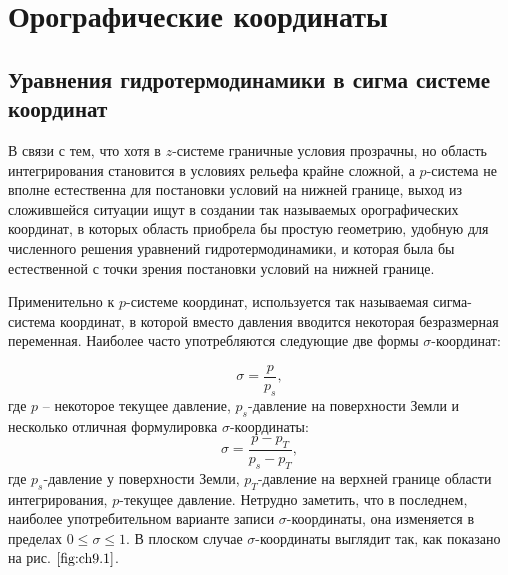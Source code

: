 \chapter{{\color{done}Орографические координаты}}



\section{{\color{done}Уравнения гидротермодинамики в сигма системе координат}}

В связи с тем, что хотя в $z$-системе граничные условия прозрачны, но область интегрирования становится в условиях рельефа крайне сложной, а $p$-система не вполне естественна для постановки условий на нижней границе, выход из сложившейся ситуации ищут в создании так называемых орографических координат, в которых область приобрела бы простую геометрию, удобную для численного решения уравнений гидротермодинамики, и которая была бы естественной с точки зрения постановки условий на нижней границе.

Применительно к $p$-системе координат, используется так называемая сигма-система координат, в которой вместо давления вводится некоторая безразмерная переменная. Наиболее часто употребляются следующие две формы $\sigma$-координат: 

\begin{equation}
\label{eq:sigma}
    \sigma=\frac{p}{p_s},
\end{equation}
где $p$ -- некоторое текущее давление, $p_s$-давление на поверхности Земли и несколько отличная формулировка $\sigma$-координаты:
\begin{equation}
    \sigma=\frac{p-p_T}{p_s-p_T},
\end{equation}
где $p_s$-давление у поверхности Земли, $p_T$-давление на верхней границе области интегрирования, $p$-текущее давление. Нетрудно заметить, что в последнем, наиболее употребительном варианте записи $\sigma$-координаты, она изменяется в пределах $0\leq\sigma\leq1$. В плоском случае $\sigma$-координаты выглядит так, как показано на рис. $\ref{fig:ch9.1}$.


